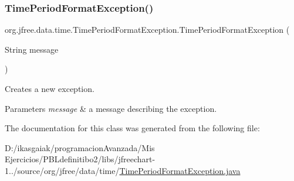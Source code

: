 \subsubsection{\texorpdfstring{Time\+Period\+Format\+Exception()}{TimePeriodFormatException()}}
{\footnotesize\ttfamily org.\+jfree.\+data.\+time.\+Time\+Period\+Format\+Exception.\+Time\+Period\+Format\+Exception (\begin{DoxyParamCaption}\item[{String}]{message }\end{DoxyParamCaption})}

Creates a new exception.


\begin{DoxyParams}{Parameters}
{\em message} & a message describing the exception. \\
\hline
\end{DoxyParams}


The documentation for this class was generated from the following file\+:\begin{DoxyCompactItemize}
\item 
D\+:/ikasgaiak/programacion\+Avanzada/\+Mis Ejercicios/\+P\+B\+Ldefinitibo2/libs/jfreechart-\/1../source/org/jfree/data/time/\mbox{\hyperlink{_time_period_format_exception_8java}{Time\+Period\+Format\+Exception.\+java}}\end{DoxyCompactItemize}
